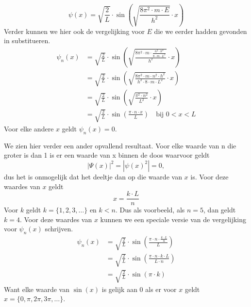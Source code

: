\documentclass[11pt,fleqn]{book} %
\begin{document}
\begin{displaymath}
\psi(x)=\sqrt{\frac{2}{L}}\cdot\sin{\left(\sqrt{\frac{8\pi^2\cdot m\cdot E}{h^2}}\cdot x\right)}
\end{displaymath}
Verder kunnen we hier ook de vergelijking voor $E$ die we eerder hadden gevonden in substitueren.
\begin{align*}
\psi_n(x) &=\sqrt{\frac{2}{L}}\cdot\sin{\left(\sqrt{\frac{8\pi^2\cdot m\cdot \frac{n^2\cdot h^2}{8\cdot m\cdot L^2}}{h^2}}\cdot x\right)}\\
&= \sqrt{\frac{2}{L}}\cdot\sin{\left(\sqrt{\frac{8\pi^2\cdot m\cdot n^2\cdot h^2}{h^2\cdot 8\cdot m\cdot L^2}}\cdot x\right)}\\
&= \sqrt{\frac{2}{L}}\cdot\sin{\left(\sqrt{\frac{\pi^2\cdot n^2}{L^2}}\cdot x\right)}\\
&= \sqrt{\frac{2}{L}}\cdot\sin{\left(\frac{\pi\cdot n\cdot x}{L}\right)}\quad \text{bij } 0<x<L
\end{align*}
Voor elke andere $x$ geldt $\psi_n(x)=0$.

We zien hier verder een ander opvallend resultaat. Voor elke waarde van n die groter is dan 1 is er een waarde van x binnen de doos waarvoor geldt
\begin{displaymath}
{\left|\Psi(x)\right|}^2=\left|{\psi(x)}^2\right|=0,
\end{displaymath}
dus het is onmogelijk dat het deeltje dan op die waarde van $x$ is. Voor deze waardes van $x$ geldt
\begin{displaymath}
x=\frac{k\cdot L}{n}
\end{displaymath}
Voor $k$ geldt $k=\{1, 2, 3, \ldots\}$ en $k<n$. Dus als voorbeeld, als $n=5$, dan geldt $k=4$. Voor deze waardes van $x$ kunnen we een speciale versie van de vergelijking voor $\psi_n(x)$ schrijven.
\begin{align*}
\psi_n(x) &= \sqrt{\frac{2}{L}}\cdot\sin{\left(\frac{\pi\cdot n\cdot \frac{k\cdot L}{n}}{L}\right)}\\
&= \sqrt{\frac{2}{L}}\cdot\sin{\left(\frac{\pi\cdot n\cdot k\cdot L}{L\cdot n}\right)}\\
&= \sqrt{\frac{2}{L}}\cdot\sin{\left(\pi\cdot k\right)}
\end{align*}
Want elke waarde van $\sin{(x)}$ is gelijk aan 0 als er voor $x$ geldt $x=\{0, \pi, 2\pi, 3\pi, \ldots\}$.
\end{document}
